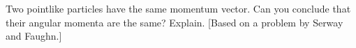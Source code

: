 Two pointlike particles have the same momentum vector. Can you
conclude that their angular momenta are the same? Explain. 
[Based on a problem by Serway and Faughn.]
